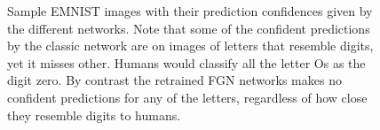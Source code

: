 \documentclass[12pt,oneside]{CUNY_PhD}
\begin{document}
\begin{figure}[!t]
    \centering
    \caption{Sample EMNIST images with their prediction confidences given by the different networks. Note that some of the confident predictions by the classic network are on images of letters that resemble digits, yet it misses other. Humans would classify all the letter Os as the digit zero. By contrast the retrained FGN networks makes no confident predictions for any of the letters, regardless of how close they resemble digits to humans.}
    \label{fig:pred-letters}
\end{figure}
\newpage %
\end{document}
